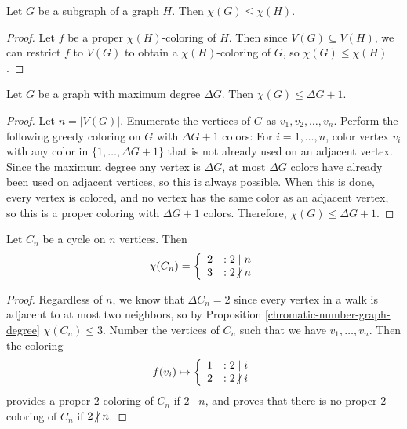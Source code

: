 \begin{prop}\label{subgraph-chromatic-number}
    Let $G$ be a subgraph of a graph $H$. Then $\chi(G) \leq \chi(H)$.
\end{prop}

\begin{proof}
    Let $f$ be a proper $\chi(H)$-coloring of $H$. Then since $V(G) \subseteq V(H)$, we can restrict $f$ to $V(G)$ to obtain a $\chi(H)$-coloring of $G$, so $\chi(G) \leq \chi(H)$.
\end{proof}

\begin{prop}\label{chromatic-number-graph-degree}
    Let $G$ be a graph with maximum degree $\Delta G$. Then $\chi(G) \leq \Delta G + 1$.
\end{prop}

\begin{proof}
    Let $n = |V(G)|$. Enumerate the vertices of $G$ as $v_1, v_2, \ldots, v_n$. Perform the following greedy coloring on $G$ with $\Delta G + 1$ colors: For $i = 1, \ldots, n$, color vertex $v_i$ with any color in $\{1, \ldots, \Delta G+1\}$ that is not already used on an adjacent vertex. Since the maximum degree any vertex is $\Delta G$, at most $\Delta G$ colors have already been used on adjacent vertices, so this is always possible. When this is done, every vertex is colored, and no vertex has the same color as an adjacent vertex, so this is a proper coloring with $\Delta G + 1$ colors. Therefore, $\chi(G) \leq \Delta G + 1$.
\end{proof}

\begin{prop}\label{cycle-chromatic-parity}
    Let $C_n$ be a cycle on $n$ vertices. Then
    \[\chi(C_n) = \left\{
        \begin{array}{lr}
            2 & : 2 \mid n \\
            3 & : 2 \centernot\mid n
        \end{array}\right.\]
\end{prop}

\begin{proof}
    Regardless of $n$, we know that $\Delta C_n = 2$ since every vertex in a walk is adjacent to at most two neighbors, so by Proposition \ref{chromatic-number-graph-degree} $\chi(C_n) \leq 3$. Number the vertices of $C_n$ such that we have $v_1, \ldots, v_n$. Then the coloring
    \[f(v_i) \mapsto \left\{
        \begin{array}{lr}
            1 & : 2 \mid i \\
            2 & : 2 \centernot\mid i
        \end{array}\right.\] provides a proper $2$-coloring of $C_n$ if $2 \mid n$, and proves that there is no proper $2$-coloring of $C_n$ if $2 \centernot\mid n$.
\end{proof}

